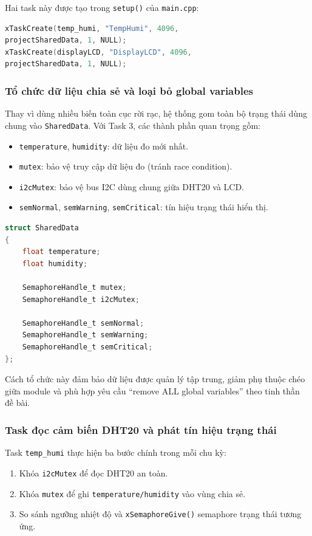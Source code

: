 Hai task này được tạo trong \texttt{setup()} của \texttt{main.cpp}:
\begin{lstlisting}[language=c, caption=Khởi tạo các task liên quan Task 3 trong main.cpp]
xTaskCreate(temp_humi, "TempHumi", 4096, 
projectSharedData, 1, NULL);
xTaskCreate(displayLCD, "DisplayLCD", 4096, 
projectSharedData, 1, NULL);
\end{lstlisting}

\subsubsection*{Tổ chức dữ liệu chia sẻ và loại bỏ global variables}

Thay vì dùng nhiều biến toàn cục rời rạc, hệ thống gom toàn bộ trạng thái dùng chung vào \texttt{SharedData}. Với Task 3, các thành phần quan trọng gồm:
\begin{itemize}
    \item \texttt{temperature}, \texttt{humidity}: dữ liệu đo mới nhất.
    \item \texttt{mutex}: bảo vệ truy cập dữ liệu đo (tránh race condition).
    \item \texttt{i2cMutex}: bảo vệ bus I2C dùng chung giữa DHT20 và LCD.
    \item \texttt{semNormal}, \texttt{semWarning}, \texttt{semCritical}: tín hiệu trạng thái hiển thị.
\end{itemize}

\begin{lstlisting}[language=c, caption=Cấu trúc SharedData dùng cho Task 3 (trích global.h)]
struct SharedData
{
    float temperature;
    float humidity;

    SemaphoreHandle_t mutex;
    SemaphoreHandle_t i2cMutex;

    SemaphoreHandle_t semNormal;
    SemaphoreHandle_t semWarning;
    SemaphoreHandle_t semCritical;
};
\end{lstlisting}

Cách tổ chức này đảm bảo dữ liệu được quản lý tập trung, giảm phụ thuộc chéo giữa module và phù hợp yêu cầu ``remove ALL global variables'' theo tinh thần đề bài.

\subsubsection*{Task đọc cảm biến DHT20 và phát tín hiệu trạng thái}

Task \texttt{temp\_humi} thực hiện ba bước chính trong mỗi chu kỳ:
\begin{enumerate}
    \item Khóa \texttt{i2cMutex} để đọc DHT20 an toàn.
    \item Khóa \texttt{mutex} để ghi \texttt{temperature/humidity} vào vùng chia sẻ.
    \item So sánh ngưỡng nhiệt độ và \texttt{xSemaphoreGive()} semaphore trạng thái tương ứng.
\end{enumerate}

